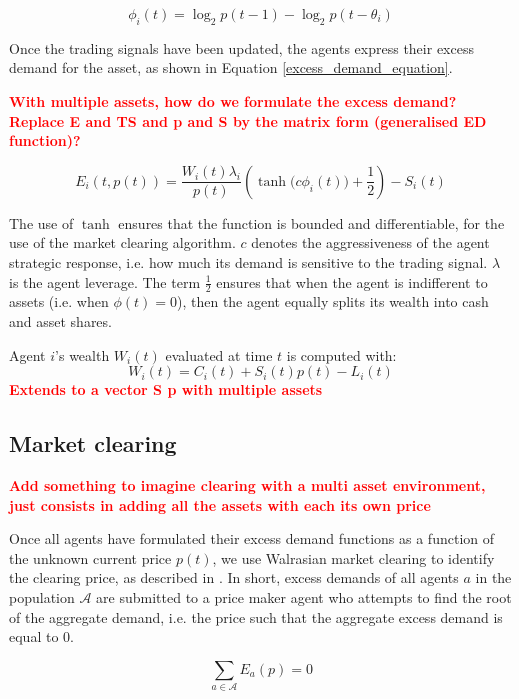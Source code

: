 \documentclass{article}
\newcommand\boldred[1]{\textcolor{red}{\textbf{#1}}}
\begin{document}
\begin{equation}
    \label{trend_following_equation}
    \phi_i(t) = \log_2 p(t-1) - \log_2 p(t-\theta_i)
\end{equation}

Once the trading signals have been updated, the agents express their excess demand for the asset, as shown in Equation \ref{excess_demand_equation}. 

\boldred{With multiple assets, how do we formulate the excess demand? Replace E and TS and p and S by the matrix form (generalised ED function)?}

\begin{equation}
\label{excess_demand_equation}
   E_i(t, p(t)) = \frac{W_i(t) {\lambda_i}}{p(t)} \left( \tanh{({c} \phi_i(t)}) + \frac{1}{2} \right) - S_i(t)
\end{equation}

The use of $\tanh$ ensures that the function is bounded and differentiable, for the use of the market clearing algorithm. $c$ denotes the aggressiveness of the agent strategic response, i.e. how much its demand is sensitive to the trading signal. $\lambda$ is the agent leverage. The term $\frac{1}{2}$ ensures that when the agent is indifferent to assets (i.e. when $\phi(t) = 0$), then the agent equally splits its wealth into cash and asset shares.

Agent $i$'s wealth $W_i(t)$ evaluated at time $t$ is computed with:
\begin{equation}
    W_i(t) = C_i(t) + S_i(t)p(t) - L_i(t)
\end{equation}
\boldred{Extends to a vector S p with multiple assets}
 
\subsection{Market clearing}
\boldred{Add something to imagine clearing with a multi asset environment, just consists in adding all the assets with each its own price}

Once all agents have formulated their excess demand functions as a function of the unknown current price $p(t)$, we use Walrasian market clearing to identify the clearing price, as described in \cite{scholl2020market}. In short, excess demands of all agents $a$ in the population $ \mathcal{A}$ are submitted to a price maker agent who attempts to find the root of the aggregate demand, i.e. the price such that the aggregate excess demand is equal to 0.

\begin{equation}
\label{market_clearing_root}
\sum_{a \in \mathcal{A}} E_{a}(p)=0
\end{equation}
\end{document}
